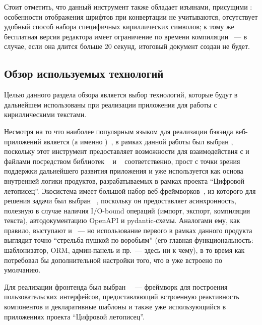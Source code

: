     Стоит отметить, что данный инструмент также обладает изъянами, присущими \word{}: особенности отображения шрифтов при конвертации не учитываются, отсутствует удобный способ набора специфичных кириллических символов; к тому же бесплатная версия редактора имеет ограничение по времени компиляции \pdf{}~--- в случае, если она длится больше 20 секунд, итоговый документ создан не будет.



\subsection{Обзор используемых технологий}
    Целью данного раздела обзора является выбор технологий, которые будут в дальнейшем использованы при реализации приложения для работы с кириллическими текстами.

    Несмотря на то что наиболее популярным языком для реализации бэкэнда веб-приложений является \js{} (а именно \nodejs{})~\cite{stackoverflowTechSurvey}, в рамках данной работы был выбран \python{}, поскольку этот инструмент предоставляет возможности для взаимодействия с \docx{} и \pdf{} файлами посредством библиотек \pythondocx{}~\cite{pythondocxdocs} и \pypdf{}~\cite{pypdfdocs} соответственно, прост с точки зрения поддержки дальнейшего развития приложения и уже используется как основа внутренней логики продуктов, разрабатываемых в рамках проекта \enquote{Цифровой летописец}. Экосистема \python{} имеет большой набор веб-фреймворков~\cite{pywebframeworks}, из которого для решения задачи был выбран \fastapi{}~\cite{fastApiReference}, поскольку он предоставляет асинхронность, полезную в случае наличия I/O-bound операций (импорт, экспорт, компиляция текста), автодокументацию OpenAPI и pydantic-схемы. Аналогами ему, как правило, выступают \django{} и \flask{}~--- но использование первого в рамках данного продукта выглядит точно \enquote{стрельба пушкой по воробьям} (его главная функциональность: шаблонизатор, ORM, админ-панель и пр.~--- здесь ни к чему), в то время как \flask{} потребовал бы дополнительной настройки того, что в \fastapi{} уже встроено по умолчанию.

    Для реализации фронтенда был выбран \vuejs{}~\cite{vuejsAPI}~--- фреймворк для построения пользовательских интерфейсов, предоставляющий встроенную реактивность компонентов и декларативные шаблоны и также уже использующийся в приложениях проекта \enquote{Цифровой летописец}.


